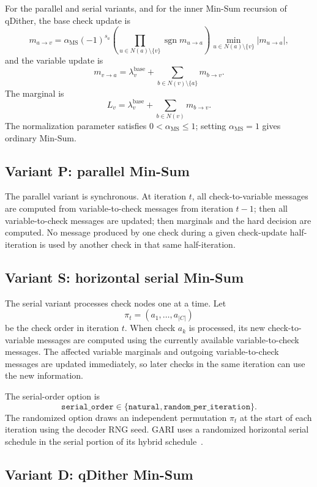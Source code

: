\documentclass[11pt,a4paper]{article}
\newcommand{\sgn}{\operatorname{sgn}}
\begin{document}
For the parallel and serial variants, and for the inner Min-Sum recursion of
qDither, the base check update is
\[
m_{a\to v}
=
\alpha_{\mathrm{MS}}
(-1)^{s_a}
\left(
\prod_{u\in N(a)\setminus\{v\}}
\sgn m_{u\to a}
\right)
\min_{u\in N(a)\setminus\{v\}}
|m_{u\to a}|,
\]
and the variable update is
\[
m_{v\to a}
=
\lambda_v^{\mathrm{base}}
+
\sum_{b\in N(v)\setminus\{a\}}
m_{b\to v}.
\]
The marginal is
\[
L_v
=
\lambda_v^{\mathrm{base}}
+
\sum_{b\in N(v)}m_{b\to v}.
\]
The normalization parameter satisfies $0<\alpha_{\mathrm{MS}}\le1$; setting
$\alpha_{\mathrm{MS}}=1$ gives ordinary Min-Sum.

\subsection{Variant P: parallel Min-Sum}

The parallel variant is synchronous. At iteration $t$, all check-to-variable
messages are computed from variable-to-check messages from iteration $t-1$;
then all variable-to-check messages are updated; then marginals and the hard
decision are computed. No message produced by one check during a given
check-update half-iteration is used by another check in that same
half-iteration.

\subsection{Variant S: horizontal serial Min-Sum}

The serial variant processes check nodes one at a time. Let
\[
\pi_t=(a_1,\ldots,a_{|C|})
\]
be the check order in iteration $t$. When check $a_k$ is processed, its new
check-to-variable messages are computed using the currently available
variable-to-check messages. The affected variable marginals and outgoing
variable-to-check messages are updated immediately, so later checks in the
same iteration can use the new information.

The serial-order option is
\[
\texttt{serial\_order}\in
\{\texttt{natural},\texttt{random\_per\_iteration}\}.
\]
The randomized option draws an independent permutation $\pi_t$ at the start of
each iteration using the decoder RNG seed. GARI uses a randomized horizontal
serial schedule in the serial portion of its hybrid schedule~\cite{gari}.

\subsection{Variant D: qDither Min-Sum}
\end{document}
